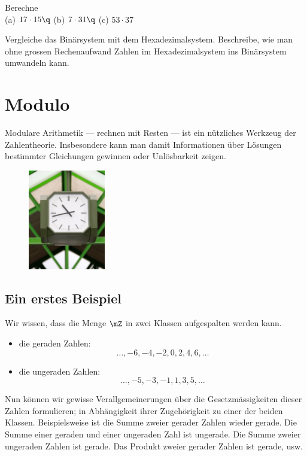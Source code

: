 \documentclass[%
11pt,%
twoside,%
titlepage,%
german,%
headsepline%
]{scrartcl}
\begin{document}
\begin{ueb}
Berechne\\[2ex]
(a) $17\cdot15\q$ (b) $7\cdot31\q$ (c) $53\cdot37$
\end{ueb}
\begin{ueb}
Vergleiche das Binärsystem mit dem Hexadezimalsystem. Beschreibe, wie man ohne grossen Rechenaufwand Zahlen im Hexadezimalsystem ins Binärsystem umwandeln kann.
\end{ueb}

\clearpage

\section{Modulo}
Modulare Arithmetik --- rechnen mit Resten --- ist ein nützliches Werkzeug der Zahlentheorie. Insbesondere kann man damit Informationen über Lösungen bestimmter Gleichungen gewinnen oder Unlösbarkeit zeigen.
\begin{figure}
  \begin{center}
    \includegraphics[width=0.3\textwidth]{pictures/uhr}
  \end{center}
\end{figure}

\subsection{Ein erstes Beispiel}
Wir wissen, dass die Menge $\mZ$ in zwei Klassen aufgespalten werden kann.
\begin{itemize}
\item die geraden Zahlen:
$$\dots,-6,-4,-2,0,2,4,6,\dots$$
\item die ungeraden Zahlen:
$$\dots,-5,-3,-1,1,3,5,\dots$$
\end{itemize}
Nun können wir gewisse Verallgemeinerungen über die Gesetzmässigkeiten dieser Zahlen formulieren; in Abhängigkeit ihrer Zugehörigkeit zu einer der beiden Klassen. Beispielsweise ist die Summe zweier gerader Zahlen wieder gerade. Die Summe einer geraden und einer ungeraden Zahl ist ungerade. Die Summe zweier ungeraden Zahlen ist gerade. Das Produkt zweier gerader Zahlen ist gerade, usw.
\end{document}
